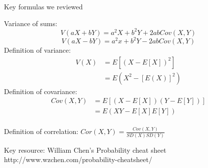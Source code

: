 \documentclass{beamer}
\begin{document}
\begin{frame}{Key formulas we reviewed}
\begin{footnotesize}
Variance of sums:
$$V(aX+bY)=a^2X+b^2Y+2abCov(X,Y)$$
$$V(aX-bY)=a^2x+b^2Y-2abCov(X,Y)$$
\medskip
Definition of variance:
\begin{align*}
V(X)&=E\left[\left(X-E[X]\right)^2\right] \\
&=E\left(X^2-\left[E(X)\right]^2\right)
\end{align*}
\medskip
Definition of covariance:
\begin{align*}
Cov(X,Y)&=E\left[\left(X-E[X]\right)\left(Y-E[Y]\right)\right] \\
&=E\left(XY-E[X]E[Y]\right)
\end{align*} \\
\medskip
Definition of correlation: $Cor(X,Y)=\frac{Cov(X,Y)}{SD(X)SD(Y)}$
\end{footnotesize}
\end{frame}

\begin{frame}{Key resource: William Chen's Probability cheat sheet}
http://www.wzchen.com/probability-cheatsheet/
\end{frame}
\end{document}
